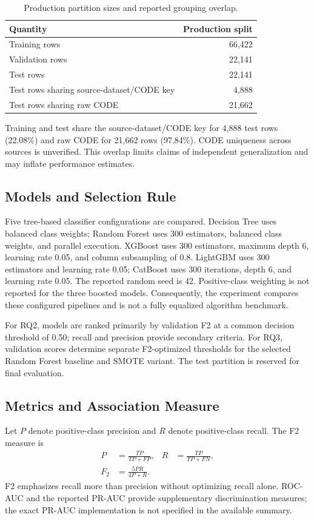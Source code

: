 \documentclass[conference]{IEEEtran}
\begin{document}
\begin{table}[t]
\centering\small
\caption{Production partition sizes and reported grouping overlap.}
\label{tab:split}
\begin{tabular}{lr}
\toprule
Quantity & Production split\\
\midrule
Training rows & 66,422\\
Validation rows & 22,141\\
Test rows & 22,141\\
Test rows sharing source-dataset/CODE key & 4,888\\
Test rows sharing raw CODE & 21,662\\
\bottomrule
\end{tabular}
\end{table}

Training and test share the source-dataset/CODE key for 4,888 test rows (22.08\%) and raw CODE for 21,662 rows (97.84\%). CODE uniqueness across sources is unverified. This overlap limits claims of independent generalization and may inflate performance estimates.

\subsection{Models and Selection Rule}
Five tree-based classifier configurations are compared. Decision Tree uses balanced class weights; Random Forest uses 300 estimators, balanced class weights, and parallel execution. XGBoost uses 300 estimators, maximum depth 6, learning rate 0.05, and column subsampling of 0.8. LightGBM uses 300 estimators and learning rate 0.05; CatBoost uses 300 iterations, depth 6, and learning rate 0.05. The reported random seed is 42. Positive-class weighting is not reported for the three boosted models. Consequently, the experiment compares these configured pipelines and is not a fully equalized algorithm benchmark.

For RQ2, models are ranked primarily by validation F2 at a common decision threshold of 0.50; recall and precision provide secondary criteria. For RQ3, validation scores determine separate F2-optimized thresholds for the selected Random Forest baseline and SMOTE variant. The test partition is reserved for final evaluation.

\subsection{Metrics and Association Measure}
Let $P$ denote positive-class precision and $R$ denote positive-class recall. The F2 measure is
\begin{align}
P&=\frac{TP}{TP+FP}, & R&=\frac{TP}{TP+FN},\\
F_2&=\frac{5PR}{4P+R}.
\end{align}
F2 emphasizes recall more than precision without optimizing recall alone. ROC-AUC and the reported PR-AUC provide supplementary discrimination measures; the exact PR-AUC implementation is not specified in the available summary.
\end{document}
